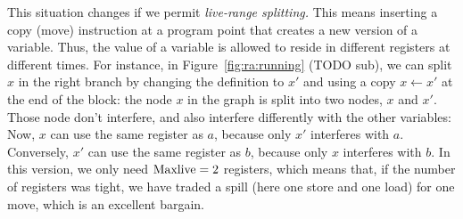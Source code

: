 {


This situation changes if we permit \emph{live-range splitting.} 
This means inserting a copy (move) instruction at a program point that creates a new version of a variable. 
Thus, the value of a variable is allowed to reside in different registers at different times. 
For instance, in Figure~\ref{fig:ra:running} (TODO sub), we can split $x$ in the right branch by changing the definition to $x'$ and using a copy $x \gets x'$ at the end of the block:
the node $x$ in the graph is split into two nodes, $x$ and $x'$.
Those node don't interfere, and also interfere differently with the other variables:
Now, $x$ can use the same register as $a$, because only $x'$ interferes with $a$.
Conversely, $x'$ can use the same register as $b$, because only $x$ interferes with $b$.
In this version, we only need $\mathrm{Maxlive} = 2$ registers, which means that, if the number of registers was tight, we have traded a spill (here one store and one load) for one move, which is an excellent bargain.


}
